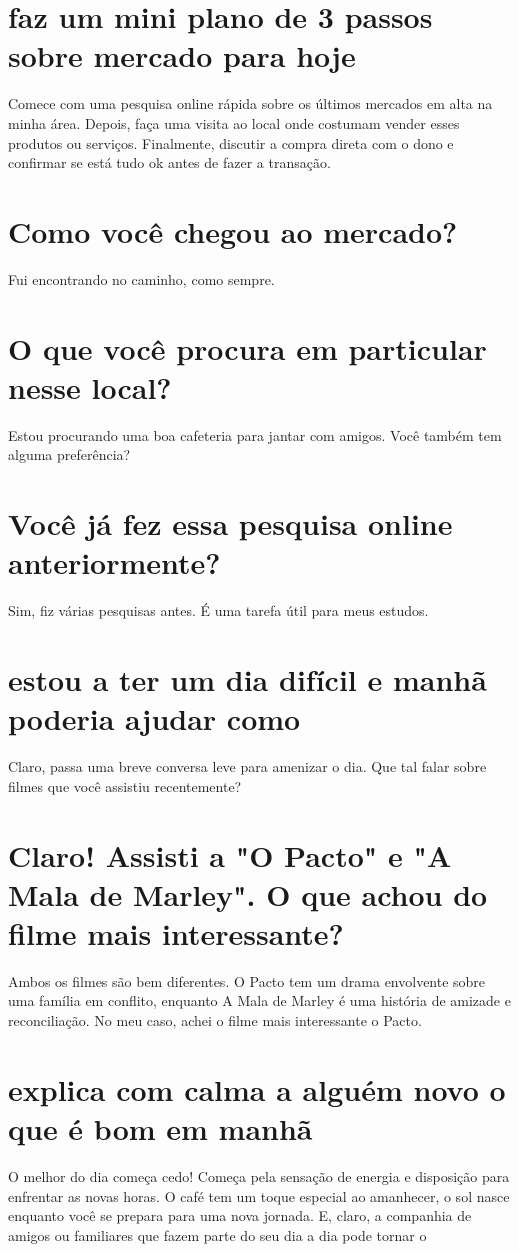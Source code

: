 \documentclass[11pt,a4paper]{article}
\begin{document}
\section{faz um mini plano de 3 passos sobre mercado para hoje}
Comece com uma pesquisa online rápida sobre os últimos mercados em alta na minha área. Depois, faça uma visita ao local onde costumam vender esses produtos ou serviços. Finalmente, discutir a compra direta com o dono e confirmar se está tudo ok antes de fazer a transação.

\section{Como você chegou ao mercado?}
Fui encontrando no caminho, como sempre.

\section{O que você procura em particular nesse local?}
Estou procurando uma boa cafeteria para jantar com amigos. Você também tem alguma preferência?

\section{Você já fez essa pesquisa online anteriormente?}
Sim, fiz várias pesquisas antes. É uma tarefa útil para meus estudos.

\section{estou a ter um dia difícil e manhã poderia ajudar como}
Claro, passa uma breve conversa leve para amenizar o dia. Que tal falar sobre filmes que você assistiu recentemente?

\section{Claro! Assisti a "O Pacto" e "A Mala de Marley". O que achou do filme mais interessante?}
Ambos os filmes são bem diferentes. O Pacto tem um drama envolvente sobre uma família em conflito, enquanto A Mala de Marley é uma história de amizade e reconciliação. No meu caso, achei o filme mais interessante o Pacto.

\section{explica com calma a alguém novo o que é bom em manhã}
O melhor do dia começa cedo! Começa pela sensação de energia e disposição para enfrentar as novas horas. O café tem um toque especial ao amanhecer, o sol nasce enquanto você se prepara para uma nova jornada. E, claro, a companhia de amigos ou familiares que fazem parte do seu dia a dia pode tornar o
\end{document}
